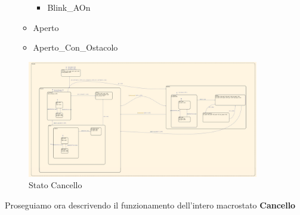 \begin{itemize}
\begin{itemize}
\begin{itemize}
                                \item Blink\_AOn 
                            \end{itemize}
                            
                        \item Aperto
                            
                        \item Aperto\_Con\_Ostacolo
                    \end{itemize}
            \end{itemize}
                
            \begin{figure}[H]
                \centering
                \includegraphics[width=0.9\textwidth]{figures/gate.png}
                \caption{Stato Cancello}
                \label{gate}
            \end{figure}

            \noindent Proseguiamo ora descrivendo il funzionamento dell'intero macrostato \textbf{Cancello}
        
